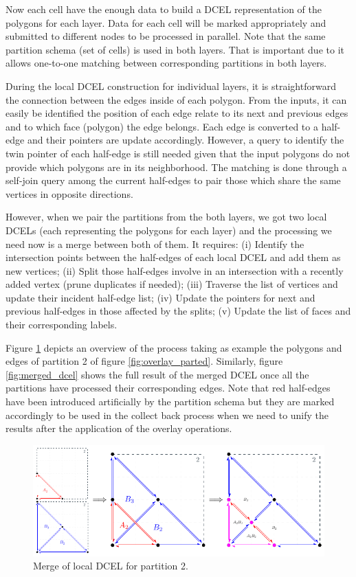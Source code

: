 Now each cell have the enough data to build a DCEL representation of the polygons for each layer.  Data for each cell will be marked appropriately and submitted to different nodes to be processed in parallel.  Note that the same partition schema (set of cells) is used in both layers.  That is important due to it allows one-to-one matching between corresponding partitions in both layers.

During the local DCEL construction for individual layers, it is straightforward the connection between the edges inside of each polygon.  From the inputs, it can easily be identified the position of each edge relate to its next and previous edges and to which face (polygon) the edge belongs.  Each edge is converted to a half-edge and their pointers are update accordingly.  However, a query to identify the twin pointer of each half-edge is still needed given that the input polygons do not provide which polygons are in its neighborhood. The matching is done through a self-join query among the current half-edges to pair those which share the same vertices in opposite directions.

However, when we pair the partitions from the both layers, we got two local DCELs (each representing the polygons for each layer) and the processing we need now is a merge between both of them.  It requires: (i) Identify the intersection points between the half-edges of each local DCEL and add them as new vertices; (ii) Split those half-edges involve in an intersection with a recently added vertex (prune duplicates if needed); (iii) Traverse the list of vertices and update their incident half-edge list; (iv) Update the pointers for next and previous half-edges in those affected by the splits; (v) Update the list of faces and their corresponding labels.

Figure \ref{fig:part2} depicts an overview of the process taking as example the polygons and edges of partition 2 of figure \ref{fig:overlay_parted}.  Similarly, figure \ref{fig:merged_dcel} shows the full result of the merged DCEL once all the partitions have processed their corresponding edges. Note that red half-edges have been introduced artificially by the partition schema but they are marked accordingly to be used in the collect back process when we need to unify the results after the application of the overlay operations.

\begin{figure}[!ht]
    \centering
    \includegraphics[width=0.9\linewidth]{figures/02-Part2}
    \caption{Merge of local DCEL for partition 2.}\label{fig:part2}
\end{figure}

